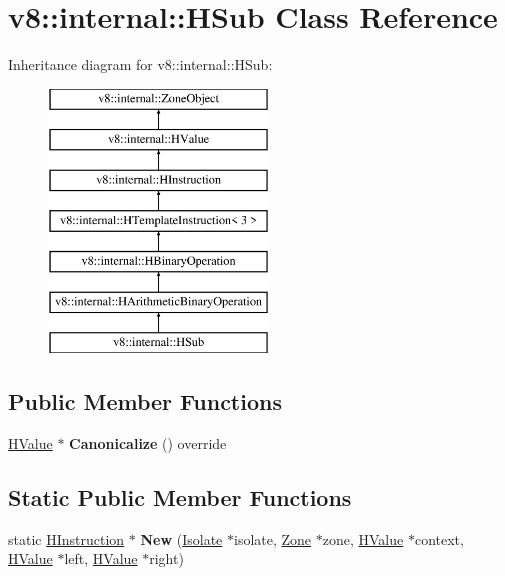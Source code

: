 \hypertarget{classv8_1_1internal_1_1_h_sub}{}\section{v8\+:\+:internal\+:\+:H\+Sub Class Reference}
\label{classv8_1_1internal_1_1_h_sub}
Inheritance diagram for v8\+:\+:internal\+:\+:H\+Sub\+:\begin{figure}[H]
\begin{center}
\leavevmode
\includegraphics[height=7.000000cm]{classv8_1_1internal_1_1_h_sub}
\end{center}
\end{figure}
\subsection*{Public Member Functions}
\begin{DoxyCompactItemize}
\item 
\hyperlink{classv8_1_1internal_1_1_h_value}{H\+Value} $\ast$ {\bfseries Canonicalize} () override\hypertarget{classv8_1_1internal_1_1_h_sub_a138dd420b8ce1ea0f89d834392c5c4db}{}\label{classv8_1_1internal_1_1_h_sub_a138dd420b8ce1ea0f89d834392c5c4db}

\end{DoxyCompactItemize}
\subsection*{Static Public Member Functions}
\begin{DoxyCompactItemize}
\item 
static \hyperlink{classv8_1_1internal_1_1_h_instruction}{H\+Instruction} $\ast$ {\bfseries New} (\hyperlink{classv8_1_1internal_1_1_isolate}{Isolate} $\ast$isolate, \hyperlink{classv8_1_1internal_1_1_zone}{Zone} $\ast$zone, \hyperlink{classv8_1_1internal_1_1_h_value}{H\+Value} $\ast$context, \hyperlink{classv8_1_1internal_1_1_h_value}{H\+Value} $\ast$left, \hyperlink{classv8_1_1internal_1_1_h_value}{H\+Value} $\ast$right)\hypertarget{classv8_1_1internal_1_1_h_sub_aec35d31a31b56cecd34d8ac3c1df6fe3}{}\label{classv8_1_1internal_1_1_h_sub_aec35d31a31b56cecd34d8ac3c1df6fe3}

\end{DoxyCompactItemize}
